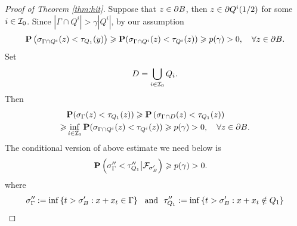 \begin{proof}[Proof of Theorem \ref{thm:hit}]
		Suppose that $z\in \partial B$, then $z\in \partial Q^i(1/2)$ for some $i\in {\mathcal I}_0$. Since $|\Gamma \cap Q^i|>\gamma |Q^i|$, by our assumption 
		\begin{equation*}
			{\mathbf P}\left( \sigma_{\Gamma\cap Q^i} (z) < \tau_{Q_1}(y) \right)\geqslant {\mathbf P}(\sigma_{\Gamma\cap Q^i} (z) <\tau_{Q^i}(z)) \geqslant p(\gamma)>0, \quad \forall z\in \partial B. 
		\end{equation*}
        Set 
        \[
            D= \bigcup_{i\in {\mathcal I}_0} Q_i. 
        \]
        Then 
        \begin{equation*}
            \begin{aligned}
                &{\mathbf P}(\sigma_{\Gamma}(z)<\tau_{Q_1}(z))\geqslant 
                {\mathbf P}\left( \sigma_{\Gamma\cap D} (z) < \tau_{Q_1}(z) \right)\\
                \geqslant& \inf_{i\in {\mathcal I}_0}{\mathbf P}(\sigma_{\Gamma\cap Q^i} (z) <\tau_{Q^i}(z)) \geqslant p(\gamma)>0, \quad \forall z\in \partial B. 
            \end{aligned}
        \end{equation*}
        The conditional version of above estimate we need below is 
        \begin{equation}\label{eq:hit3}
            \begin{aligned}
                &{\mathbf P}\left(\sigma''_{\Gamma}<\tau''_{Q_1}\big| {\mathcal F}_{\sigma'_B}\right)\geqslant p(\gamma)>0.  
            \end{aligned}
        \end{equation}
        where 
        \[
        \sigma''_{\Gamma}:=\inf\left\{t>\sigma'_{B}: x+x_t\in \Gamma\right\} ~\mbox{ and }~ \tau''_{Q_1}:=\inf\left\{t>\sigma'_{B}: x+x_t\notin Q_1\right\}
        \]
        

\end{proof}
